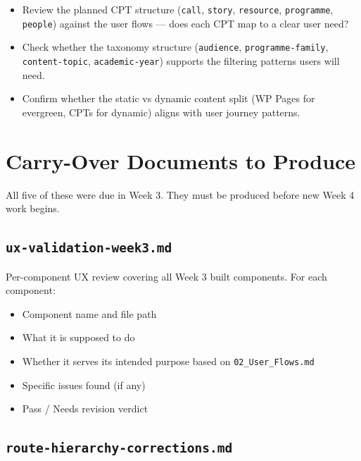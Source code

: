 \documentclass[12pt,a4paper]{article}
\begin{document}
\begin{itemize}
    \item[$\square$] Review the planned CPT structure (\texttt{call}, \texttt{story}, \texttt{resource}, \texttt{programme}, \texttt{people}) against the user flows --- does each CPT map to a clear user need?
    \item[$\square$] Check whether the taxonomy structure (\texttt{audience}, \texttt{programme-family}, \texttt{content-topic}, \texttt{academic-year}) supports the filtering patterns users will need.
    \item[$\square$] Confirm whether the static vs dynamic content split (WP Pages for evergreen, CPTs for dynamic) aligns with user journey patterns.
\end{itemize}

\section{Carry-Over Documents to Produce}

All five of these were due in Week 3. They must be produced before new Week 4 work begins.

\subsection{\texttt{ux-validation-week3.md}}

Per-component UX review covering all Week 3 built components. For each component:

\begin{itemize}
    \item Component name and file path
    \item What it is supposed to do
    \item Whether it serves its intended purpose based on \texttt{02\_User\_Flows.md}
    \item Specific issues found (if any)
    \item Pass / Needs revision verdict
\end{itemize}

\subsection{\texttt{route-hierarchy-corrections.md}}
\end{document}
